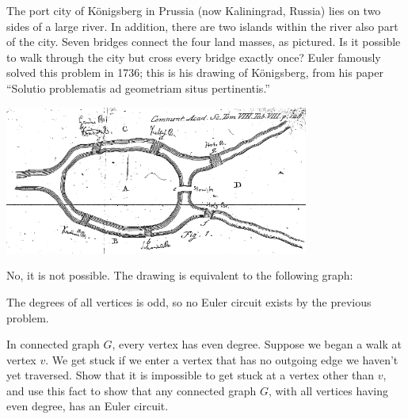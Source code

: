 \documentclass[11pt]{article}
\begin{document}
\begin{problem} %
The port city of K\"{o}nigsberg in Prussia (now Kaliningrad, Russia) lies on two sides of a large river. In addition, there are two islands within the river
also part of the city. Seven bridges connect the four land masses, as pictured. Is it possible to walk through the city but cross every bridge exactly once?
Euler famously solved this problem in 1736; this is his drawing of K\"{o}nigsberg, from his paper ``Solutio problematis ad geometriam situs pertinentis.''
\begin{center}
\includegraphics[width=10cm]{bridges.png}
\end{center}
\end{problem}

\begin{solution}
No, it is not possible. The drawing is equivalent to the following graph:
\begin{center}
\end{center}
The degrees of all vertices is odd, so no Euler circuit exists by the previous problem.
\end{solution}

\begin{problem} %
In connected graph $G$, every vertex has even degree. Suppose we began a walk at vertex $v$. We get stuck if we enter a vertex that has no outgoing edge
we haven't yet traversed. Show that it is impossible to get stuck at a vertex other than $v$, and use this fact to show that any connected graph $G$, with
all vertices having even degree, has an Euler circuit.
\end{problem}
\end{document}
